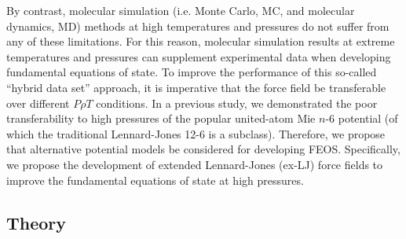 \documentclass[11pt,a4paper]{article}
\begin{document}




By contrast, molecular simulation (i.e. Monte Carlo, MC, and molecular dynamics, MD) methods at high temperatures and pressures do not suffer from any of these limitations. For this reason, molecular simulation results at extreme temperatures and pressures can supplement experimental data when developing fundamental equations of state. To improve the performance of this so-called ``hybrid data set'' approach, it is imperative that the force field be transferable over different $P \rho T$ conditions. In a previous study, we demonstrated the poor transferability to high pressures of the popular united-atom Mie $n$-6 potential (of which the traditional Lennard-Jones 12-6 is a subclass). Therefore, we propose that alternative potential models be considered for developing FEOS. Specifically, we propose the development of extended Lennard-Jones (ex-LJ) force fields to improve the fundamental equations of state at high pressures.   

\subsection{Theory}

\end{document}
